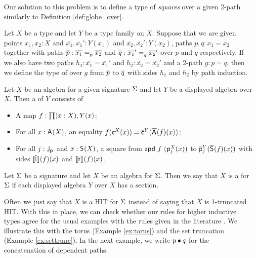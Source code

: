 Our solution to this problem is to define a type of \emph{squares} over a given 2-path similarly to Definition \ref{def:globe_over}.

\begin{definition}
Let $X$ be a type and let $Y$ be a type family on $X$.
Suppose that we are given points $x_1, x_2 : X$ and $\overline{x_1}, \overline{x_1}' : Y(x_1)$ and $\overline{x_2}, \overline{x_2}' : Y(x_2)$, paths $p, q : x_1 = x_2$ together with paths $\pover{p} : \pathover{p}{\overline{x_1}}{\overline{x_2}}$ and $\pover{q} : \pathover{q}{\overline{x_1}'}{\overline{x_2}'}$ over $p$ and $q$ respectively.
If we also have two paths $h_1 : \overline{x_1} = \overline{x_1}'$ and $h_2 : \overline{x_2} = \overline{x_2}'$ and a 2-path $g : p = q$,
then we define the type of  over $g$ from $\pover{p}$ to $\pover{q}$ with sides $h_1$ and $h_2$ by path induction.
\end{definition}

\begin{definition}
\label{def:section}
Let $X$ be an algebra for a given signature $\sign$ and let $Y$ be a displayed algebra over $X$.
Then a  of $Y$ consists of
\begin{itemize}
	\item A map $f : \depprod{(x : X)}{Y(x)}$;
	\item For all $x : \polyAct{\pointconstr}{X}$, an equality $f(\AlgPoint{X}(x)) = \DispAlgPoint{Y}(\polyDmap{\pointconstr}{f}(x))$;
	\item For all $j : \pathlabel$ and $x : \polyAct{\patharg}{X}$, a square from
	$\apd{f}{(\AlgPath{X}{j}(x))}$
	to
	$\DispAlgPath{Y}{j}(\polyDmap{\patharg}{f}(x))$
	with sides
	$\pathendpointDnat{\pathleft}{f}(x)$
	and
	$\pathendpointDnat{\pathright}{f}(x)$.
\end{itemize}
\end{definition}

\begin{definition}
Let $\sign$ be a signature and let $X$ be an algebra for $\sign$.
Then we say that $X$ is a  for $\sign$ if each displayed algebra $Y$ over $X$ has a section.
\end{definition}

Often we just say that $X$ is a HIT for $\sign$ instead of saying that $X$ is 1-truncated HIT.
With this in place, we can check whether our rules for higher inductive types
agree for the usual examples with the rules given in the literature \cite{hottbook}.
We illustrate this with the torus (Example \ref{ex:torus}) and the set truncation (Example \ref{ex:settrunc}).
In the next example, we write $p \vcomp q$ for the concatenation of dependent paths.


